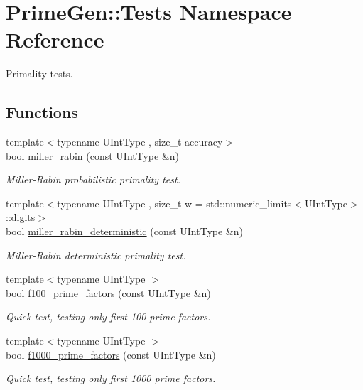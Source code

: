 \hypertarget{namespace_prime_gen_1_1_tests}{\section{Prime\+Gen\+:\+:Tests Namespace Reference}
\label{namespace_prime_gen_1_1_tests}
}


Primality tests.  


\subsection*{Functions}
\begin{DoxyCompactItemize}
\item 
{\footnotesize template$<$typename U\+Int\+Type , size\+\_\+t accuracy$>$ }\\bool \hyperlink{namespace_prime_gen_1_1_tests_ab4ab789bde1badebff58de914a31afb3}{miller\+\_\+rabin} (const U\+Int\+Type \&n)
\begin{DoxyCompactList}\small\item\em Miller-\/\+Rabin probabilistic primality test. \end{DoxyCompactList}\item 
{\footnotesize template$<$typename U\+Int\+Type , size\+\_\+t w = std\+::numeric\+\_\+limits$<$\+U\+Int\+Type$>$\+::digits$>$ }\\bool \hyperlink{namespace_prime_gen_1_1_tests_a48457a4b0960c5451b655bf9c39aa2b6}{miller\+\_\+rabin\+\_\+deterministic} (const U\+Int\+Type \&n)
\begin{DoxyCompactList}\small\item\em Miller-\/\+Rabin deterministic primality test. \end{DoxyCompactList}\item 
{\footnotesize template$<$typename U\+Int\+Type $>$ }\\bool \hyperlink{namespace_prime_gen_1_1_tests_ac7142f51753981c6ae4ca9c87413ab76}{f100\+\_\+prime\+\_\+factors} (const U\+Int\+Type \&n)
\begin{DoxyCompactList}\small\item\em Quick test, testing only first 100 prime factors. \end{DoxyCompactList}\item 
{\footnotesize template$<$typename U\+Int\+Type $>$ }\\bool \hyperlink{namespace_prime_gen_1_1_tests_affb664bd1da7fcf28787172279145d4a}{f1000\+\_\+prime\+\_\+factors} (const U\+Int\+Type \&n)
\begin{DoxyCompactList}\small\item\em Quick test, testing only first 1000 prime factors. \end{DoxyCompactList}\end{DoxyCompactItemize}


